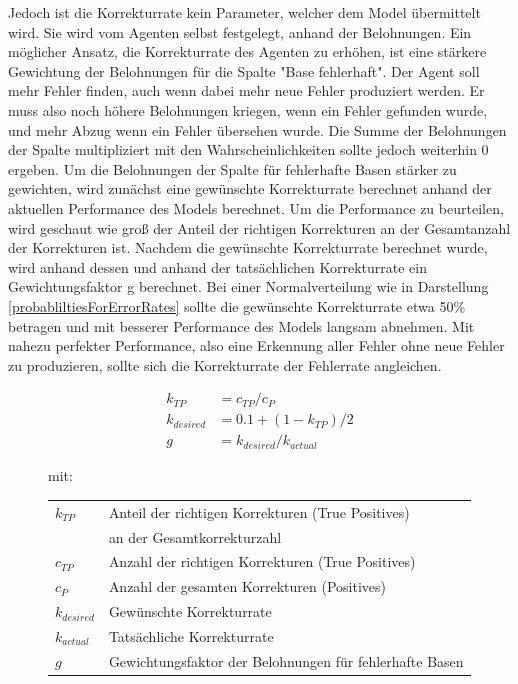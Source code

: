 \documentclass[oneside,bibliography=totocnumbered,BCOR=5mm]{scrbook}%
\makeatletter
\theoremstyle{definition}
\theoremstyle{definition}
\theoremstyle{definition}
\theoremstyle{definition}
\theoremstyle{definition}
\theoremstyle{definition}
\newenvironment{conditions}[1][mit:]
  {#1 \begin{tabular}[t]{>{$}l<{$} @{${}={}$} l}}
  {\end{tabular}\\[\belowdisplayskip]}
\makeatother
\begin{document}
Jedoch ist die Korrekturrate kein Parameter, welcher dem Model übermittelt wird.
Sie wird vom Agenten selbst festgelegt, anhand der Belohnungen. 
Ein möglicher Ansatz, die Korrekturrate des Agenten zu erhöhen, ist eine stärkere Gewichtung der Belohnungen für die Spalte "Base fehlerhaft".
Der Agent soll mehr Fehler finden, auch wenn dabei mehr neue Fehler produziert werden.
Er muss also noch höhere Belohnungen kriegen, wenn ein Fehler gefunden wurde,
und mehr Abzug wenn ein Fehler übersehen wurde. Die Summe der Belohnungen der Spalte 
multipliziert mit den Wahrscheinlichkeiten sollte jedoch weiterhin 0 ergeben.
Um die Belohnungen der Spalte für fehlerhafte Basen stärker zu gewichten, wird zunächst eine
gewünschte Korrekturrate berechnet anhand der aktuellen Performance des Models berechnet.
Um die Performance zu beurteilen, wird geschaut wie groß der Anteil der richtigen Korrekturen
an der Gesamtanzahl der Korrekturen ist. Nachdem die gewünschte Korrekturrate berechnet wurde,
wird anhand dessen und anhand der tatsächlichen Korrekturrate ein Gewichtungsfaktor g berechnet.
Bei einer Normalverteilung wie in Darstellung \ref{probabliltiesForErrorRates} sollte die gewünschte 
Korrekturrate etwa 50\% betragen und mit besserer Performance des Models langsam abnehmen. 
Mit nahezu perfekter Performance, also eine Erkennung aller Fehler ohne neue Fehler zu produzieren,
sollte sich die Korrekturrate der Fehlerrate angleichen.

\begin{figure}
  \begin{align*}
    k_{TP} &= c_{TP} / c_{P} \\
    k_{desired} &= 0.1 + (1 - k_{TP} ) / 2 \\
    g &= k_{desired} / k_{actual}
  \end{align*} 
  
  \begin{conditions}
    k_{TP}      & Anteil der richtigen Korrekturen (True Positives) \\
                & an der Gesamtkorrekturzahl \\
    c_{TP}      & Anzahl der richtigen Korrekturen (True Positives) \\
    c_{P}       & Anzahl der gesamten Korrekturen (Positives) \\
    k_{desired} & Gewünschte Korrekturrate \\
    k_{actual}  & Tatsächliche Korrekturrate \\
    g           & Gewichtungsfaktor der Belohnungen für fehlerhafte Basen
  \end{conditions}
  
  \end{figure}
  \leavevmode \\
\end{document}
